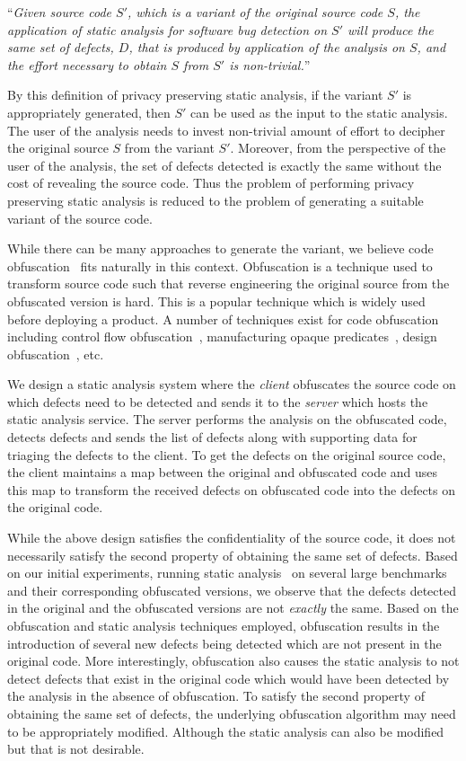 \documentclass[conference]{IEEEtran}
\begin{document}
``{\em Given source code $S'$, which is a variant of the original source code $S$, the application of static 
analysis for software bug detection on $S'$ will produce the same set of defects, $D$, 
that is produced by application of the analysis on $S$, and the effort necessary to obtain 
$S$ from $S'$ is non-trivial.}'' 

By this definition of privacy preserving static analysis, if the variant $S'$ is appropriately generated, 
then $S'$ can be used as the input to the static analysis. The user of the analysis needs to 
invest non-trivial amount of effort to decipher the original source $S$ from the variant $S'$. Moreover, 
from the perspective of the user of the analysis, the set of defects detected is exactly the same without 
the cost of revealing the source code. Thus the problem of performing privacy preserving static analysis 
is reduced to the problem of generating a suitable variant of the source code. 

While there can be many approaches to generate the variant, we believe code obfuscation~\cite{collberg} 
fits naturally in this context. Obfuscation is a technique used to transform source code such that
reverse engineering the original source from the obfuscated version is hard. This is a popular 
technique which is widely used~\cite{zelix,jbco,proguard} before deploying a product. A number of 
techniques exist for code obfuscation including control flow obfuscation~\cite{controlflowobf}, 
manufacturing opaque predicates~\cite{collberg}, design obfuscation~\cite{designobf}, etc. 

We design a static analysis system where the {\em client} obfuscates the source code on which defects 
need to be detected and sends it to the {\em server} which hosts the static analysis service. The server 
performs the analysis on the obfuscated code, detects defects and sends the list of 
defects along with supporting data for triaging the defects to the client. To get the defects on the original source code, 
the client maintains a map between the original and obfuscated code and uses this map to transform 
the received defects on obfuscated code into the defects on the original code. 

While the above design satisfies the confidentiality of the source code, it does not necessarily 
satisfy the second property of obtaining the same set of defects. Based on our initial experiments, 
running static analysis~\cite{findbugs} on several large benchmarks~\cite{tomcat,lucene,eclipse} 
and their corresponding obfuscated versions, we observe that the defects detected in the original 
and the obfuscated versions are not {\em exactly} the same. Based on the obfuscation and static analysis techniques 
employed, obfuscation results in the introduction of several new defects being detected which are not 
present in the original code. More interestingly, obfuscation also causes the static analysis to not 
detect defects that exist in the original code which would have been detected by the analysis in the 
absence of obfuscation. To satisfy the second property of obtaining the same set of defects, the underlying 
obfuscation algorithm may need to be appropriately modified. Although the static analysis can also be 
modified but that is not desirable.
 
\end{document}
